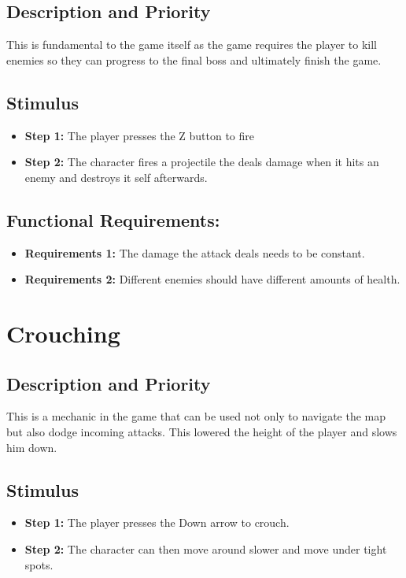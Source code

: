 \subsection{Description and Priority}
This is fundamental to the game itself as the game requires the player to kill enemies so they can progress to the final boss and ultimately finish the game.
\subsection{Stimulus}
\begin{itemize}
    \item \textbf{Step 1:} The player presses the Z button to fire
    \item \textbf{Step 2:} The character fires a projectile the deals damage when it hits an enemy and destroys it self afterwards.
\end{itemize}
\subsection{Functional Requirements:}
\begin{itemize}
    \item \textbf{Requirements 1:} The damage the attack deals needs to be constant.
    \item \textbf{Requirements 2:} Different enemies should have different amounts of health.
\end{itemize}

\section{Crouching}
\subsection{Description and Priority}
This is a mechanic in the game that can be used not only to navigate the map but also dodge incoming attacks. This lowered the height of the player and slows him down.
\subsection{Stimulus}
\begin{itemize}
    \item \textbf{Step 1:} The player presses the Down arrow to crouch.
    \item \textbf{Step 2:} The character can then move around slower and move under tight spots. 
\end{itemize}
